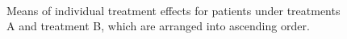 	\begin{figure}[ht!]
		\begin{center}
			\\
		\end{center}
		\caption{Means of individual treatment effects for patients under treatments A and treatment B, which are arranged into ascending order.}
		\label{fig4_7}
	\end{figure}
	
